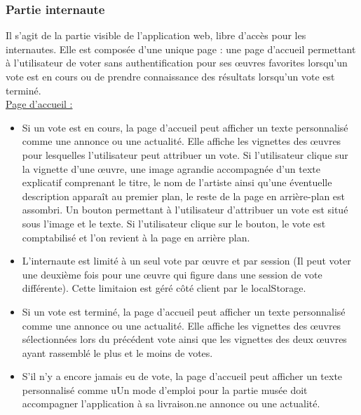 \documentclass[a4paper]{article}
\begin{document}
\subsubsection{Partie internaute}
Il s’agit de la partie visible de l’application web, libre d’accès pour les internautes. Elle est composée d’une unique page : une page d’accueil permettant à l’utilisateur de voter sans authentification pour ses œuvres favorites lorsqu'un vote est en cours ou de prendre connaissance des résultats lorsqu'un vote est terminé.\\

\underline{Page d'accueil :}\\

\begin{itemize}
\item Si un vote est en cours, la page d'accueil peut afficher un texte personnalisé comme une annonce ou une actualité. Elle affiche les vignettes des œuvres pour lesquelles l'utilisateur peut attribuer un vote. Si l'utilisateur clique sur la vignette d'une œuvre, une image agrandie accompagnée d'un texte explicatif comprenant le titre, le nom de l'artiste ainsi qu'une éventuelle description apparaît au premier plan, le reste de la page en arrière-plan est assombri. Un bouton permettant à l'utilisateur d'attribuer un vote est situé sous l'image et le texte. Si l'utilisateur clique sur le bouton, le vote est comptabilisé et l'on revient à la page en arrière plan.\\

\item L'internaute est limité à un seul vote par œuvre et par session (Il peut voter une deuxième fois pour une œuvre qui figure dans une session de vote différente). Cette limitaion est géré côté client par le localStorage.\\

\item Si un vote est terminé, la page d'accueil peut afficher un texte personnalisé comme une annonce ou une actualité. Elle affiche les vignettes des œuvres sélectionnées lors du précédent vote ainsi que les vignettes des deux œuvres ayant rassemblé le plus et le moins de votes.\\

\item S'il n'y a encore jamais eu de vote, la page d'accueil peut afficher un texte personnalisé comme uUn mode d’emploi pour la partie musée doit accompagner l’application à sa livraison.ne annonce ou une actualité.\\
\end{itemize}
\end{document}
